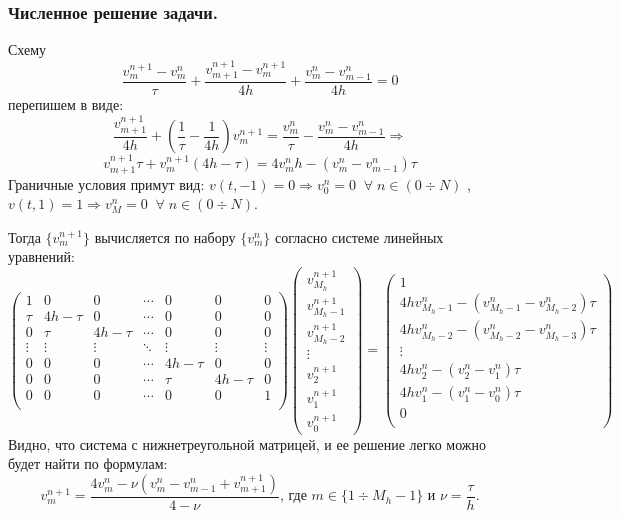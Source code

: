 \documentclass[a4paper,12pt]{article}
\begin{document}
\subsubsection{Численное решение задачи.}
Схему 
\[
\frac{v^{n+1}_m-v^n_m}{\tau}+\frac{v^{n+1}_{m+1}-v^{n+1}_m}{4h}+\frac{v^n_m-v^n_{m-1}}{4h}=0
\]
перепишем в виде:
\[
\frac{v^{n+1}_{m+1}}{4h}+(\frac1\tau-\frac1{4h})v^{n+1}_m=\frac{v^n_m}{\tau}-\frac{v^n_m-v^n_{m-1}}{4h}
\Rightarrow\]
\[
v^{n+1}_{m+1}\tau+v^{n+1}_m(4h-\tau)=4v^n_m h-(v^n_m-v^n_{m-1})\tau
\]
Граничные условия примут вид: $v(t,-1)=0 \Rightarrow v^n_0=0 \;\; \forall\; n \in (0 \div N)$ , $v(t,1)=1 \Rightarrow v^n_M=0 \;\; \forall\; n \in (0 \div N)$.

Тогда $\{v^{n+1}_m\}$ вычисляется по набору $\{v^{n}_m\}$ согласно системе линейных уравнений:
\[
\begin{pmatrix}
    1    & 0 & 0  & \cdots        &0&0&0\\
    \tau & 4h -\tau  & 0 &\cdots    &0&0&0\\
    0 & \tau & 4h -\tau &\cdots    &0&0&0\\
    \vdots & \vdots & \vdots &\ddots&\vdots&\vdots&\vdots\\
    0&0&0&\cdots& 4h -\tau &0&0\\
    0&0&0&\cdots&\tau & 4h -\tau&0  \\
    0&0&0&\cdots&0&0&1\\
\end{pmatrix}
\begin{pmatrix}
    v_{M_h}^{n+1}\\
    v_{M_h-1}^{n+1}\\
    v_{M_h-2}^{n+1}\\
    \vdots\\
    v_{2}^{n+1}\\
    v_{1}^{n+1}\\
    v_{0}^{n+1}
\end{pmatrix}=
\begin{pmatrix}
    1\\
    4hv^n_{M_h-1}-(v^n_{M_h-1}-v^n_{M_h-2})\tau\\
    4hv^n_{M_h-2}-(v^n_{M_h-2}-v^n_{M_h-3})\tau\\
    \vdots\\
    4hv^n_{2}-(v^n_{2}-v^n_{1})\tau\\
    4hv^n_{1}-(v^n_{1}-v^n_{0})\tau\\
    0\\
\end{pmatrix}
\]
Видно, что система с нижнетреугольной матрицей, и ее решение легко можно будет найти по формулам:
\[
    v_m^{n+1}=\frac{4 v_m^n-\nu(v_m^n-v^n_{m-1}+v^{n+1}_{m+1})}{4-\nu}\text{,  где $m \in \{1 \div M_h-1\}$  и  $\nu = \frac{\tau}{h}$.}
\]
\end{document}
